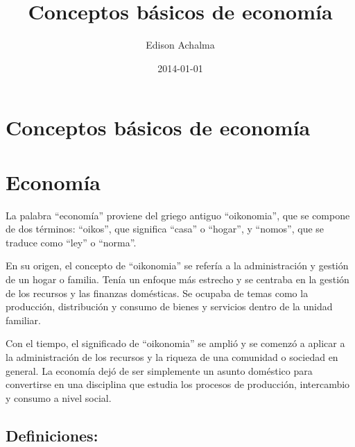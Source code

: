 \documentclass[
  jou,
  floatsintext,
  longtable,
  a4paper,
  nolmodern,
  notxfonts,
  notimes,
  12pt,
  colorlinks=true,linkcolor=blue,citecolor=blue,urlcolor=blue]{apa7}
\title{Conceptos básicos de economía}
\author{Edison Achalma}
\affiliation{
{Escuela Profesional de Economía, Universidad Nacional de San Cristóbal
de Huamanga}}
\date{2014-01-01}
\begin{document}
\maketitle


\hypertarget{toc}{}
\tableofcontents
\newpage
\section[Introduction]{Conceptos básicos de economía}

\setcounter{secnumdepth}{3}

\setlength\LTleft{0pt}




\section{Economía}\label{economuxeda}

La palabra ``economía'' proviene del griego antiguo ``oikonomia'', que
se compone de dos términos: ``oikos'', que significa ``casa'' o
``hogar'', y ``nomos'', que se traduce como ``ley'' o ``norma''.

En su origen, el concepto de ``oikonomia'' se refería a la
administración y gestión de un hogar o familia. Tenía un enfoque más
estrecho y se centraba en la gestión de los recursos y las finanzas
domésticas. Se ocupaba de temas como la producción, distribución y
consumo de bienes y servicios dentro de la unidad familiar.

Con el tiempo, el significado de ``oikonomia'' se amplió y se comenzó a
aplicar a la administración de los recursos y la riqueza de una
comunidad o sociedad en general. La economía dejó de ser simplemente un
asunto doméstico para convertirse en una disciplina que estudia los
procesos de producción, intercambio y consumo a nivel social.

\subsection{Definiciones:}\label{definiciones}
\end{document}
